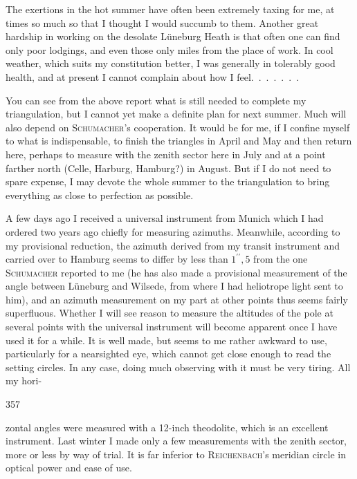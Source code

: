 \par\noindent\hspace*{\parindent}The exertions in the hot summer have often been extremely taxing for me, at times so much so that I thought I would succumb to them.
Another great hardship in working on the desolate Lüneburg Heath is that often one can find only poor lodgings, and even those only miles from the place of work.
In cool weather, which suits my constitution better, I was generally in tolerably good health, and at present I cannot complain about how I feel.\ .\ .\ .\ .\ .\ .

\par\noindent\hspace*{\parindent}You can see from the above report what is still needed to complete my triangulation, but I cannot yet make a definite plan for next summer. Much will also depend on \textsc{Schumacher}'s cooperation.
It would be  for me, if I confine myself to what is indispensable, to finish the triangles in April and May and then return here, perhaps to measure with the zenith sector here in July and at a point farther north (Celle, Harburg, Hamburg?) in August.
But if I do not need to spare expense, I may devote the whole summer to the triangulation to bring everything as close to perfection as possible.

\par\noindent\hspace*{\parindent}A few days ago I received a universal instrument from Munich which I had ordered two years ago chiefly for measuring azimuths.
Meanwhile, according to my provisional reduction, the azimuth derived from my transit instrument and carried over to Hamburg seems to differ by less than \(1^{\prime\prime}{,}5\) from the one \textsc{Schumacher} reported to me (he has also made a provisional measurement of the angle between Lüneburg and Wilsede, from where I had heliotrope light sent to him), and an azimuth measurement on my part at other points thus seems fairly superfluous.
Whether I will see reason to measure the altitudes of the pole at several points with the universal instrument will become apparent once I have used it for a while.
It is well made, but seems to me rather awkward to use, particularly for a nearsighted eye, which cannot get close enough to read the setting circles.
In any case, doing much observing with it must be very tiring.
All my hori-
\par\clearpage
{}\hfill357\par\medskip
\noindent zontal angles were measured with a 12-inch theodolite, which is an excellent instrument.
Last winter I made only a few measurements with the zenith sector, more or less by way of trial. It is far inferior to \textsc{Reichenbach}'s meridian circle in optical power and ease of use.

